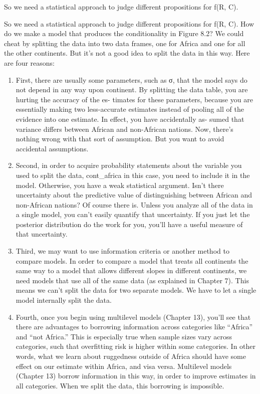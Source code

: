 \documentclass[
]{article}
\begin{document}
So we need a statistical approach to judge different propositions for
f(R, C).

So we need a statistical approach to judge different propositions for
f(R, C). How do we make a model that produces the conditionality in
Figure 8.2? We could cheat by splitting the data into two data frames,
one for Africa and one for all the other continents. But it's not a good
idea to split the data in this way. Here are four reasons:

\begin{enumerate}
\def\labelenumi{\arabic{enumi}.}
\item
  First, there are usually some parameters, such as σ, that the model
  says do not depend in any way upon continent. By splitting the data
  table, you are hurting the accuracy of the es- timates for these
  parameters, because you are essentially making two less-accurate
  estimates instead of pooling all of the evidence into one estimate. In
  effect, you have accidentally as- sumed that variance differs between
  African and non-African nations. Now, there's nothing wrong with that
  sort of assumption. But you want to avoid accidental assumptions.
\item
  Second, in order to acquire probability statements about the variable
  you used to split the data, cont\_africa in this case, you need to
  include it in the model. Otherwise, you have a weak statistical
  argument. Isn't there uncertainty about the predictive value of
  distinguishing between African and non-African nations? Of course
  there is. Unless you analyze all of the data in a single model, you
  can't easily quantify that uncertainty. If you just let the posterior
  distribution do the work for you, you'll have a useful measure of that
  uncertainty.
\item
  Third, we may want to use information criteria or another method to
  compare models. In order to compare a model that treats all continents
  the same way to a model that allows different slopes in different
  continents, we need models that use all of the same data (as explained
  in Chapter 7). This means we can't split the data for two separate
  models. We have to let a single model internally split the data.
\item
  Fourth, once you begin using multilevel models (Chapter 13), you'll
  see that there are advantages to borrowing information across
  categories like ``Africa'' and ``not Africa.'' This is especially true
  when sample sizes vary across categories, such that overfitting risk
  is higher within some categories. In other words, what we learn about
  ruggedness outside of Africa should have some effect on our estimate
  within Africa, and visa versa. Multilevel models (Chapter 13) borrow
  information in this way, in order to improve estimates in all
  categories. When we split the data, this borrowing is impossible.
\end{enumerate}
\end{document}
